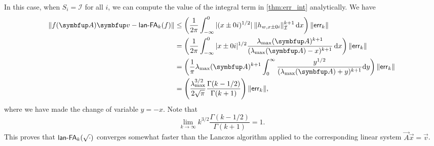 In this case, when $S_i = \mathcal{I}$ for all $i$, we can  compute the value of the integral term in \cref{thm:err_int} analytically. We have
\begin{align*}
\| f( \vec{A} ) \vec{v} - \lan_k (f) \| 
&\leq \left(\frac{1}{2 \pi} \int_{-\infty}^0 | (x \pm 0 i)^{1/2} | \:  \| h_{w,x \pm 0 i} \|_{\mathcal{I}}^{k+1} \,\d{x}  \right) \| \err_k \| 
\\&= \left(\frac{1}{2 \pi} \int_{-\infty}^0 | x \pm 0 i|^{1/2}\frac{ \lambda_{\text{max}} ( \vec{A})^{k+1}}{( \lambda_{\text{max}} ( \vec{A} ) - x )^{k+1}}\,\d{x}   \right) \| \err_k \| 
\\&= \left(\frac{1}{\pi} \lambda_{\text{max}} ( \vec{A} )^{k+1}  \int_0^{\infty} \frac{y^{1/2}}{( \lambda_{\text{max}} ( \vec{A} ) + y )^{k+1}}\d{y} \right) \| \err_k \| 
\\&= \left( \frac{\lmax^{3/2}}{2\sqrt{\pi}} \frac{\Gamma(k-1/2)}{\Gamma(k+1)}  \right) \| \err_k \|,
\end{align*}
where we have made the change of variable \( y = -x \). 
Note that
\begin{equation*}
    \lim_{k \to \infty }k^{3/2}  \frac{\Gamma(k-1/2)}{\Gamma(k+1)} = 1.
\end{equation*}
This proves that \( \textup{\textsf{lan-FA}}_k ( \sqrt{\cdot}) \) converges somewhat faster than the Lanczos algorithm applied to the corresponding linear system \( \vec{A} \vec{x} = \vec{v} \).


